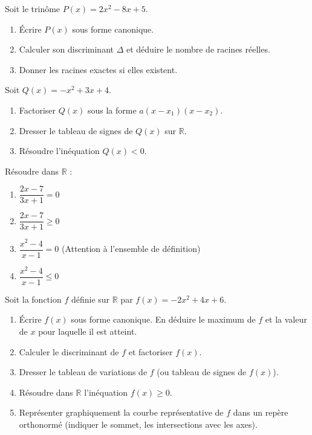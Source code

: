 \documentclass[11pt]{article}
\newcounter{popsec}
\newcounter{popsub}
\newcommand{\courssub}[1]{%
  \stepcounter{popsub}%
  \par\vspace{9pt}\noindent{\popxbold\fontsize{11.5}{13}\selectfont\color{popink}{\color{poporange}\thepopsec.\thepopsub}\hspace{6pt}#1}\par\nopagebreak\vspace{4pt}
}
\begin{document}
\begin{exercice}
Soit le trinôme $P(x) = 2x^2 - 8x + 5$.
\begin{enumerate}
    \item Écrire $P(x)$ sous forme canonique.
    \item Calculer son discriminant $\Delta$ et déduire le nombre de racines réelles.
    \item Donner les racines exactes si elles existent.
\end{enumerate}
\end{exercice}

\begin{exercice}
Soit $Q(x) = -x^2 + 3x + 4$.
\begin{enumerate}
    \item Factoriser $Q(x)$ sous la forme $a(x-x_1)(x-x_2)$.
    \item Dresser le tableau de signes de $Q(x)$ sur $\mathbb{R}$.
    \item Résoudre l'inéquation $Q(x) < 0$.
\end{enumerate}
\end{exercice}

\courssub{Je m'entraîne}

\begin{exercice}
Résoudre dans $\mathbb{R}$ :
\begin{enumerate}
    \item $\dfrac{2x-7}{3x+1} = 0$
    \item $\dfrac{2x-7}{3x+1} \ge 0$
    \item $\dfrac{x^2-4}{x-1} = 0$ \quad (Attention à l'ensemble de définition)
    \item $\dfrac{x^2-4}{x-1} \le 0$
\end{enumerate}
\end{exercice}

\begin{exercice}
Soit la fonction $f$ définie sur $\mathbb{R}$ par $f(x) = -2x^2 + 4x + 6$.
\begin{enumerate}
    \item Écrire $f(x)$ sous forme canonique. En déduire le maximum de $f$ et la valeur de $x$ pour laquelle il est atteint.
    \item Calculer le discriminant de $f$ et factoriser $f(x)$.
    \item Dresser le tableau de variations de $f$ (ou tableau de signes de $f(x)$).
    \item Résoudre dans $\mathbb{R}$ l'inéquation $f(x) \ge 0$.
    \item Représenter graphiquement la courbe représentative de $f$ dans un repère orthonormé (indiquer le sommet, les intersections avec les axes).
\end{enumerate}
\end{exercice}
\end{document}
